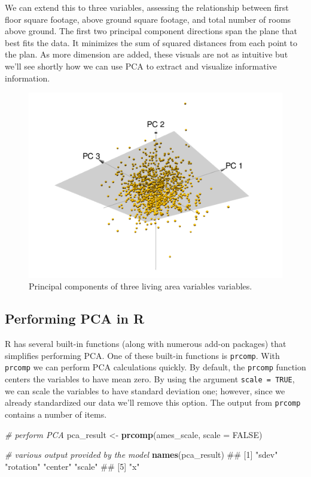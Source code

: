 \documentclass[]{book}
\newenvironment{Shaded}{\begin{snugshade}}{\end{snugshade}}
\newcommand{\CommentTok}[1]{\textcolor[rgb]{0.56,0.35,0.01}{\textit{#1}}}
\newcommand{\DataTypeTok}[1]{\textcolor[rgb]{0.13,0.29,0.53}{#1}}
\newcommand{\KeywordTok}[1]{\textcolor[rgb]{0.13,0.29,0.53}{\textbf{#1}}}
\newcommand{\NormalTok}[1]{#1}
\newcommand{\OtherTok}[1]{\textcolor[rgb]{0.56,0.35,0.01}{#1}}
\newcommand{\StringTok}[1]{\textcolor[rgb]{0.31,0.60,0.02}{#1}}
\theoremstyle{definition}
\theoremstyle{definition}
\theoremstyle{definition}
\theoremstyle{remark}
\begin{document}
We can extend this to three variables, assessing the relationship
between first floor square footage, above ground square footage, and
total number of rooms above ground. The first two principal component
directions span the plane that best fits the data. It minimizes the sum
of squared distances from each point to the plan. As more dimension are
added, these visuals are not as intuitive but we'll see shortly how we
can use PCA to extract and visualize informative information.

\begin{figure}

{\centering \includegraphics[width=0.7\linewidth]{illustrations/3D-PCA} 

}

\caption{Principal components of three living area variables variables.}\label{fig:pca-3d-plot}
\end{figure}

\hypertarget{performing-pca-in-r}{%
\subsection{Performing PCA in R}\label{performing-pca-in-r}}

R has several built-in functions (along with numerous add-on packages)
that simplifies performing PCA. One of these built-in functions is
\texttt{prcomp}. With \texttt{prcomp} we can perform PCA calculations
quickly. By default, the \texttt{prcomp} function centers the variables
to have mean zero. By using the argument \texttt{scale\ =\ TRUE}, we can
scale the variables to have standard deviation one; however, since we
already standardized our data we'll remove this option. The output from
\texttt{prcomp} contains a number of items.

\begin{Shaded}
\begin{Highlighting}[]
\CommentTok{# perform PCA}
\NormalTok{pca_result <-}\StringTok{ }\KeywordTok{prcomp}\NormalTok{(ames_scale, }\DataTypeTok{scale =} \OtherTok{FALSE}\NormalTok{)}

\CommentTok{# various output provided by the model}
\KeywordTok{names}\NormalTok{(pca_result)}
\NormalTok{## [1] "sdev"     "rotation" "center"   "scale"   }
\NormalTok{## [5] "x"}
\end{Highlighting}
\end{Shaded}
\end{document}
